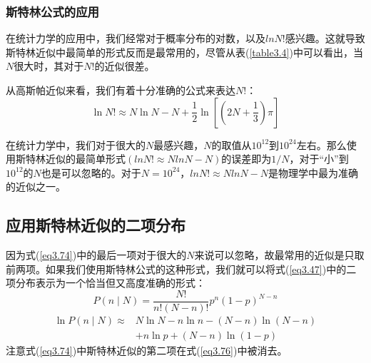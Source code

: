 \documentclass[UTF8]{ctexart}
\numberwithin{equation}{section}%
\numberwithin{figure}{section}%
\begin{document}
    \subsubsection{斯特林公式的应用}
    在统计力学的应用中，我们经常对于概率分布的对数，以及$lnN!$感兴趣。这就导致斯特林近似中最简单的形式反而是最常用的，尽管从表(\ref{table3.4})中可以看出，当$N$很大时，其对于$N!$的近似很差。

    从高斯帕近似来看，我们有着十分准确的公式来表达$N!$：
    \begin{equation}\label{eq3.74}
        \ln N ! \approx N \ln N-N+\frac{1}{2} \ln \left[\left(2 N+\frac{1}{3}\right) \pi\right]
    \end{equation}

    在统计力学中，我们对于很大的$N$最感兴趣，$N$的取值从$10^{12}$到$10^{24}$左右。那么使用斯特林近似的最简单形式\((lnN!\approx NlnN-N)\)的误差即为$1/N$，对于“小”到$10^{12}$的$N$也是可以忽略的。对于$N=10^{24}$，$lnN!\approx NlnN-N$是物理学中最为准确的近似之一。

    \subsection{应用斯特林近似的二项分布}
    因为式(\ref{eq3.74})中的最后一项对于很大的$N$来说可以忽略，故最常用的近似是只取前两项。如果我们使用斯特林公式的这种形式，我们就可以将式(\ref{eq3.47})中的二项分布表示为一个恰当但又高度准确的形式：
    \begin{equation}
        P(n \mid N)=\frac{N !}{n !(N-n) !} p^{n}(1-p)^{N-n}
    \end{equation}
    \begin{equation}\label{eq3.76}
        \begin{aligned}
            \ln P(n \mid N) \approx & N \ln N-n \ln n-(N-n) \ln (N-n) \\
            &+n \ln p+(N-n) \ln (1-p)
            \end{aligned}
    \end{equation}
    注意式(\ref{eq3.74})中斯特林近似的第二项在式(\ref{eq3.76})中被消去。
\end{document}

